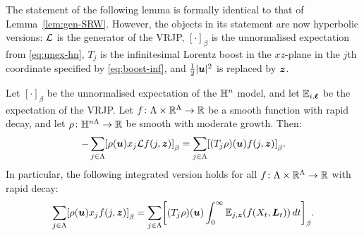 \documentclass[11pt,a4paper]{article}
\begin{document}
The statement of the following lemma is formally identical to that of
Lemma~\ref{lem:gen-SRW}.  However, the objects in its statement are
now hyperbolic versions: $\mathcal L$ is the generator of the VRJP,
$[\cdot]_\beta$ is the unnormalised expectation from
\eqref{eq:unex-hn}, $T_j$ is the infinitesimal Lorentz boost in the
$xz$-plane in the $j$th coordinate specified by \eqref{eq:boost-inf},
and $\frac12 |\boldsymbol{u}|^2$ is replaced by $\boldsymbol{z}$.

\begin{lemma}
  \label{lem:gen-hyp}
  Let $[\cdot]_\beta$ be the unnormalised expectation of the $\mathbb{H}^n$
  model, and let $\mathbb{E}_{i,\boldsymbol{\ell}}$ be the expectation of the VRJP.
  Let $f\colon \Lambda\times \mathbb{R}^\Lambda \to \mathbb{R}$ be a smooth function
  with rapid decay, and let $\rho\colon \mathbb{H}^{n\Lambda}\to \mathbb{R}$ be
  smooth with moderate growth.  Then:
  \begin{equation}
    \label{eq:gen-hyp}
    -\sum_{j\in\Lambda}\cb{\rho(\V{u})x_{j} \cL f(j,\V{z})}_{\beta}
    =
    \sum_{j\in\Lambda} \cb{(T_j\rho)(\V{u})f(j,\V{z})}_{\beta}
    .
  \end{equation}
  In particular, the following  integrated version holds for all
  $f\colon\Lambda\times\mathbb{R}^{\Lambda}\to\mathbb{R}$ with rapid decay:
  \begin{equation}
    \label{eq:generic-iso-hyp}
    \sum_{j\in\Lambda}\uspin{\rho(\V{u})x_{j} f(j, \V{z})}_{\beta}
    =
    \sum_{j\in\Lambda} \uspin{(T_j\rho)(\V{u})\int_0^\infty \E_{j,\V{z}}(f(X_t,\V{L}_t))\,dt}_{\beta}
    .
  \end{equation}
\end{lemma}
\end{document}
